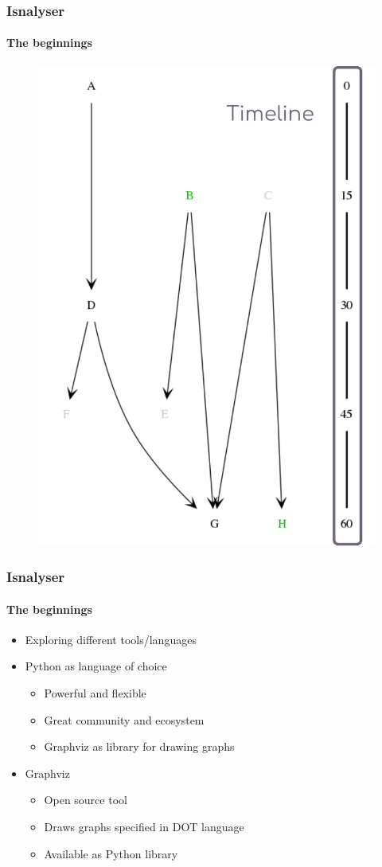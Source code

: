 \documentclass[9pt]{beamer}
\begin{document}
\begin{frame}
\frametitle{Isnalyser}
\framesubtitle{The beginnings}
\begin{figure}
	\includegraphics[width=.5\linewidth]{figures/isnalyser_parts_3.pdf}
\end{figure}
\end{frame} 
\begin{frame}
\frametitle{Isnalyser}
\framesubtitle{The beginnings}
\begin{itemize}%
	\item Exploring different tools/languages
	\item Python as language of choice
	\begin{itemize}
		\item Powerful and flexible
		\item Great community and ecosystem
		\item Graphviz as library for drawing graphs
	\end{itemize}
	\item Graphviz
	\begin{itemize}
		\item Open source tool
		\item Draws graphs specified in DOT language
		\item Available as Python library
	\end{itemize}
\end{itemize}
\end{frame} 
\end{document}
